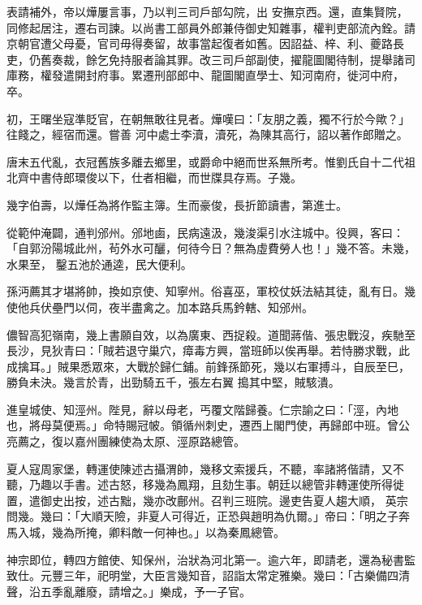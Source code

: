 \begin{pinyinscope}
 表請補外，帝以燁屢言事，乃以判三司戶部勾院，出
 安撫京西。還，直集賢院，同修起居注，遷右司諫。以尚書工部員外郎兼侍御史知雜事，權判吏部流內銓。請京朝官遭父母憂，官司毋得奏留，故事當起復者如舊。因詔益、梓、利、夔路長吏，仍舊奏裁，餘乞免持服者論其罪。改三司戶部副使，擢龍圖閣待制，提舉諸司庫務，權發遣開封府事。累遷刑部郎中、龍圖閣直學士、知河南府，徙河中府，卒。



 初，王曙坐寇準貶官，在朝無敢往見者。燁嘆曰：「友朋之義，獨不行於今歟？」往餞之，經宿而還。嘗善
 河中處士李瀆，瀆死，為陳其高行，詔以著作郎贈之。



 唐末五代亂，衣冠舊族多離去鄉里，或爵命中絕而世系無所考。惟劉氏自十二代祖北齊中書侍郎環俊以下，仕者相繼，而世牒具存焉。子幾。



 幾字伯壽，以燁任為將作監主簿。生而豪俊，長折節讀書，第進士。



 從範仲淹闢，通判邠州。邠地鹵，民病遠汲，幾浚渠引水注城中。役興，客曰：「自郭汾陽城此州，茍外水可釃，何待今日？無為虛費勞人也！」幾不答。未幾，水果至，
 鑿五池於通逵，民大便利。



 孫沔薦其才堪將帥，換如京使、知寧州。俗喜巫，軍校仗妖法結其徒，亂有日。幾使他兵伏壘門以伺，夜半盡禽之。加本路兵馬鈐轄、知邠州。



 儂智高犯嶺南，幾上書願自效，以為廣東、西捉殺。道聞蔣偕、張忠戰沒，疾馳至長沙，見狄青曰：「賊若退守巢穴，瘴毒方興，當班師以俟再舉。若恃勝求戰，此成擒耳。」賊果悉眾來，大戰於歸仁鋪。前鋒孫節死，幾以右軍搏斗，自辰至巳，勝負未決。幾言於青，出勁騎五千，張左右翼
 搗其中堅，賊駭潰。



 進皇城使、知涇州。陛見，辭以母老，丐覆文階歸養。仁宗諭之曰：「涇，內地也，將母莫便焉。」命特賜冠帔。領循州刺史，遷西上閣門使，再歸郎中班。曾公亮薦之，復以嘉州團練使為太原、涇原路總管。



 夏人寇周家堡，轉運使陳述古攝渭帥，幾移文索援兵，不聽，率諸將偕請，又不聽，乃趣以手書。述古怒，移幾為鳳翔，且劾生事。朝廷以總管非轉運使所得徙置，遣御史出按，述古黜，幾亦改鄜州。召判三班院。邊吏告夏人趨大順，
 英宗問幾。幾曰：「大順天險，非夏人可得近，正恐與趙明為仇爾。」帝曰：「明之子奔馬入城，幾為所掩，卿料敵一何神也。」以為秦鳳總管。



 神宗即位，轉四方館使、知保州，治狀為河北第一。逾六年，即請老，還為秘書監致仕。元豐三年，祀明堂，大臣言幾知音，詔詣太常定雅樂。幾曰：「古樂備四清聲，沿五季亂離廢，請增之。」樂成，予一子官。




\end{pinyinscope}
